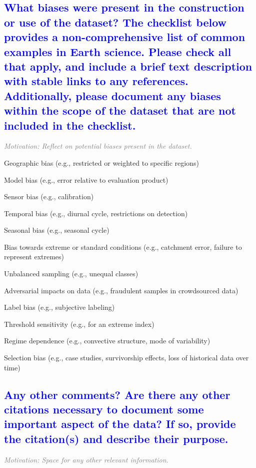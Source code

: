 \documentclass[letterpaper, 10 pt, transmag]{IEEEtran}
\begin{document}
\textcolor{blue}{\subsection{What biases were present in the construction or use of the dataset? The checklist below provides a non-comprehensive list of common examples in Earth science. Please check all that apply, and include a brief text description with stable links to any references. Additionally, please document any biases within the scope of the dataset that are not included in the checklist.}}
\textcolor{gray}{\textit{Motivation: Reflect on potential biases present in the dataset.}}

\begin{todolist}
    \item Geographic bias (e.g., restricted or weighted to specific regions)
    \item Model bias (e.g., error relative to evaluation product)
    \item Sensor bias (e.g., calibration)
    \item Temporal bias (e.g., diurnal cycle, restrictions on detection)
    \item Seasonal bias (e.g., seasonal cycle)
    \item Bias towards extreme or standard conditions (e.g., catchment error, failure to represent extremes)
    \item Unbalanced sampling (e.g., unequal classes)
    \item Adversarial impacts on data (e.g., fraudulent samples in crowdsourced data)
    \item Label bias (e.g., subjective labeling)
    \item Threshold sensitivity (e.g., for an extreme index)
    \item Regime dependence (e.g., convective structure, mode of variability)
    \item Selection bias (e.g., case studies, survivorship effects, loss of historical data over time)
\end{todolist}

\textcolor{blue}{\subsection{Any other comments? Are there any other citations necessary to document some important aspect of the data? If so, provide the citation(s) and describe their purpose.}}
\textcolor{gray}{\textit{Motivation: Space for any other relevant information.}}


\bigskip
 
  

\end{document}
